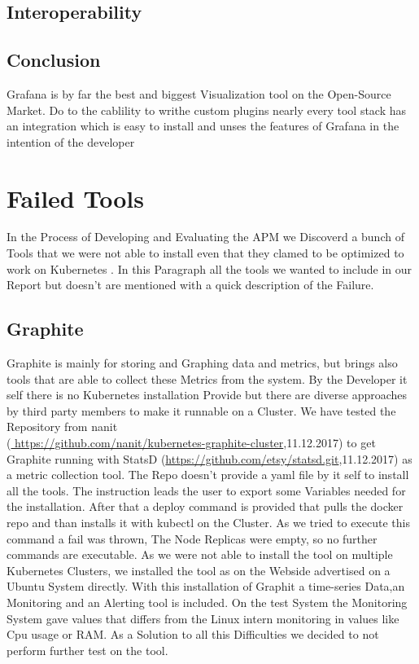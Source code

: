 \subsection{Interoperability}

\subsection{Conclusion}
Grafana is by far the best and biggest Visualization tool on the Open-Source Market. Do to the cablility to writhe custom plugins nearly every tool stack has an integration which is easy to install and unses the features of Grafana in the intention of the developer 

\section{Failed Tools}%
In the Process of Developing and Evaluating the APM we Discoverd a bunch of Tools that we were not able to install even that they clamed to be optimized to work on Kubernetes .
In this Paragraph all the tools we wanted to include in our Report but doesn't are mentioned with a quick description of the Failure.
\subsection{Graphite}
Graphite is mainly for storing and Graphing data and metrics, but brings also tools that are able to collect these Metrics from the system. By the Developer it self there is no Kubernetes installation Provide but there are diverse approaches by third party members to make it runnable on a Cluster. We have tested the Repository from nanit\\(\url{ https://github.com/nanit/kubernetes-graphite-cluster},11.12.2017) to get Graphite running with StatsD (\url{https://github.com/etsy/statsd.git},11.12.2017) as a metric collection tool. The Repo doesn't provide a yaml file by it self to install all the tools. The instruction leads the user to export some Variables needed for the installation. After that a deploy command is provided that pulls the docker repo and than installs it with kubectl on the Cluster. As we tried to execute this command a fail was thrown, The Node Replicas were empty, so no further commands are executable. As we were not able to install the tool on multiple Kubernetes Clusters, we installed the tool as on the Webside advertised on a Ubuntu System directly. With this installation of Graphit a time-series Data,an Monitoring and an Alerting tool is included. On the test System the Monitoring System gave values that differs from the Linux intern monitoring in values like Cpu usage or RAM. As a Solution to all this Difficulties we decided to not perform further test on the tool.

